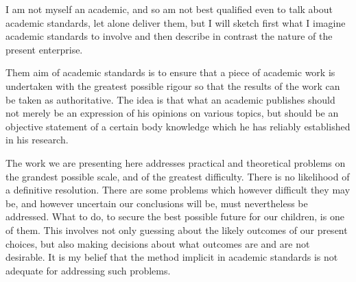 I am not myself an academic, and so am not best qualified even to talk about academic standards, let alone deliver them, but I will sketch first what I imagine academic standards to involve and then describe in contrast the nature of the present enterprise.

Them aim of academic standards is to ensure that a piece of academic work is undertaken with the greatest possible rigour so that the results of the work can be taken as authoritative.
The idea is that what an academic publishes should not merely be an expression of his opinions on various topics, but should be an objective statement of a certain body knowledge which he has reliably established in his research.

The work we are presenting here addresses practical and theoretical problems on the grandest possible scale, and of the greatest difficulty.
There is no likelihood of a definitive resolution.
There are some problems which however difficult they may be, and however uncertain our conclusions will be, must nevertheless be addressed.
What to do, to secure the best possible future for our children, is one of them.
This involves not only guessing about the likely outcomes of our present choices, but also making decisions about what outcomes are and are not desirable.
It is my belief that the method implicit in academic standards is not adequate for addressing such problems.














